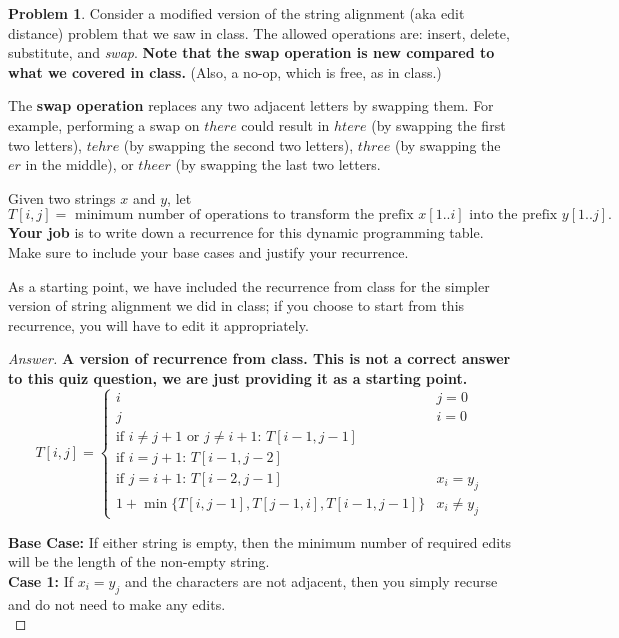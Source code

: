 \documentclass[11pt]{article}
\theoremstyle{definition}
\theoremstyle{definition}
\newtheorem{required}{Problem}
\theoremstyle{definition}
\begin{document}
\setcounter{required}{21}
\begin{required} 
Consider a modified version of the string alignment (aka edit distance) problem that we saw in class. The allowed operations are: insert, delete, substitute, and \emph{swap}. \textbf{Note that the swap operation is new compared to what we covered in class.} (Also, a no-op, which is free, as in class.)

The \textbf{swap operation} replaces any two adjacent letters by swapping them. For example, performing a swap on $there$ could result in $htere$ (by swapping the first two letters), $tehre$ (by swapping the second two letters), $three$ (by swapping the $er$ in the middle), or $theer$ (by swapping the last two letters. 

Given two strings $x$ and $y$, let
\[
T[i,j] = \text{ minimum number of operations to transform the prefix $x[1..i]$ into the prefix $y[1..j]$.}
\]
\textbf{Your job} is to write down a recurrence for this dynamic programming table. Make sure to include your base cases and justify your recurrence.

As a starting point, we have included the recurrence from class for the simpler version of string alignment we did in class; if you choose to start from this recurrence, you will have to edit it appropriately. 

\begin{proof}[Answer]
\textbf{A version of recurrence from class. This is not a correct answer to this quiz question, we are just providing it as a starting point.}
\[
T[i,j] = \begin{cases}
i & j = 0 \\
j & i = 0 \\
\text{if $i \neq j + 1$ or $j \neq i + 1$: } T[i-1,j-1]\\
\text{if $i = j + 1$: } T[i-1,j-2]\\
\text{if $j = i + 1$: } T[i - 2, j - 1]
 & x_i = y_j \\
1 + \min\{T[i,j-1], T[j-1,i], T[i-1,j-1]\} & x_i \neq y_j
\end{cases}
\]


\textbf{Base Case: } If either string is empty, then the minimum number of required edits will be the length of the non-empty string.\\

\textbf{Case 1: } If $x_i = y_j$ and the characters are not adjacent, then you simply recurse and do not need to make any edits.\\


\end{proof}
\end{required}
\end{document}
